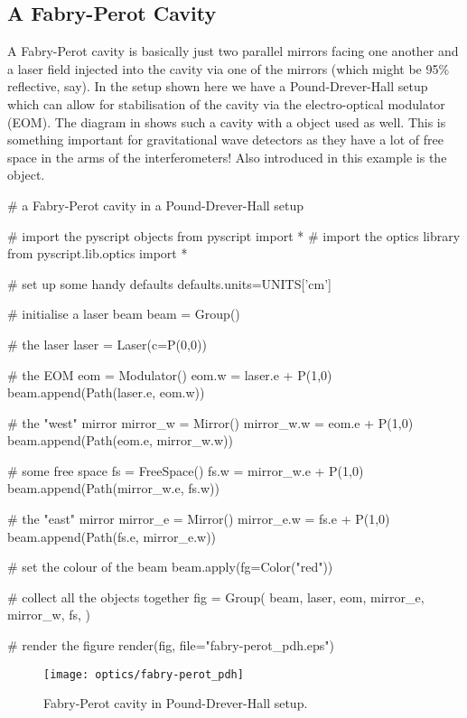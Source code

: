 \subsection{A Fabry-Perot Cavity}

A Fabry-Perot cavity is basically just two parallel mirrors facing one
another and a laser field injected into the cavity via one of the mirrors
(which might be 95\% reflective, say).  In the setup shown here we have a
Pound-Drever-Hall setup which can allow for stabilisation of the cavity via
the electro-optical modulator (EOM).  The diagram in
 shows such a cavity with a 
object used as well.  This is something important for gravitational wave
detectors as they have a lot of free space in the arms of the
interferometers!  Also introduced in this example is the 
object.

\begin{python}
# a Fabry-Perot cavity in a Pound-Drever-Hall setup

# import the pyscript objects
from pyscript import *
# import the optics library
from pyscript.lib.optics import *

# set up some handy defaults
defaults.units=UNITS['cm']

# initialise a laser beam
beam = Group()

# the laser
laser = Laser(c=P(0,0))

# the EOM
eom = Modulator()
eom.w = laser.e + P(1,0)
beam.append(Path(laser.e, eom.w))

# the "west" mirror
mirror_w = Mirror()
mirror_w.w = eom.e + P(1,0)
beam.append(Path(eom.e, mirror_w.w))

# some free space
fs = FreeSpace()
fs.w = mirror_w.e + P(1,0)
beam.append(Path(mirror_w.e, fs.w))

# the "east" mirror
mirror_e = Mirror()
mirror_e.w = fs.e + P(1,0)
beam.append(Path(fs.e, mirror_e.w))

# set the colour of the beam
beam.apply(fg=Color("red"))

# collect all the objects together
fig = Group(
        beam,
        laser,
        eom,
        mirror_e, mirror_w,
        fs,
        )

# render the figure
render(fig,
        file="fabry-perot_pdh.eps")
\end{python}

\begin{figure}[ht]
\centerline{\texttt{[image: optics/fabry-perot\_pdh]}}
\caption{Fabry-Perot cavity in Pound-Drever-Hall setup.}
\label{fig:fabry-perot-pdh}
\end{figure}

